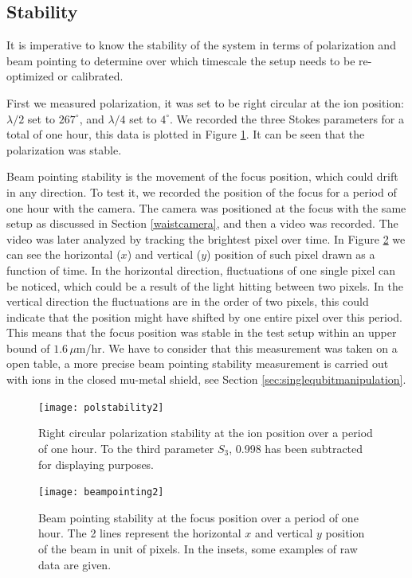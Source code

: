 \subsection{Stability}
\label{sec:stability}
It is imperative to know the stability of the system in terms of polarization and beam pointing to determine over which timescale the setup needs to be re-optimized or calibrated.\par
First we measured polarization, it was set to be right circular at the ion position: $\lambda/2$ set to $267^\circ$, and $\lambda/4$ set to $4^\circ$. We recorded the three Stokes parameters for a total of one hour, this data is plotted in Figure \ref{polstability}. It can be seen that the polarization was stable.\par %
Beam pointing stability is the movement of the focus position, which could drift in any direction. To test it, we recorded the position of the focus for a period of one hour with the camera. The camera was positioned at the focus with the same setup as discussed in Section \ref{waistcamera}, and then a video was recorded. The video was later analyzed by tracking the brightest pixel over time. In Figure \ref{beampointing} we can see the horizontal ($x$) and vertical ($y$) position of such pixel drawn as a function of time. In the horizontal direction, fluctuations of one single pixel can be noticed, which could be a result of the light hitting between two pixels. In the vertical direction the fluctuations are in the order of two pixels, this could indicate that the position might have shifted by one entire pixel over this period. This means that the focus position was stable in the test setup within an upper bound of $1.6\,\mu$m/hr. We have to consider that this measurement was taken on a open table, a more precise beam pointing stability measurement is carried out with ions in the closed mu-metal shield, see Section \ref{sec:singlequbitmanipulation}.

\begin{figure}[H]
\centering
\texttt{[image: polstability2]}
\caption{Right circular polarization stability at the ion position over a period of one hour. To the third parameter $S_3$, 0.998 has been subtracted for displaying purposes.}
\label{polstability}
\end{figure}

\begin{figure}[H]
\centering
\texttt{[image: beampointing2]}
\caption{Beam pointing stability at the focus position over a period of one hour. The 2 lines represent the horizontal $x$ and vertical $y$ position of the beam in unit of pixels. In the insets, some examples of raw data are given.}
\label{beampointing}
\end{figure}


